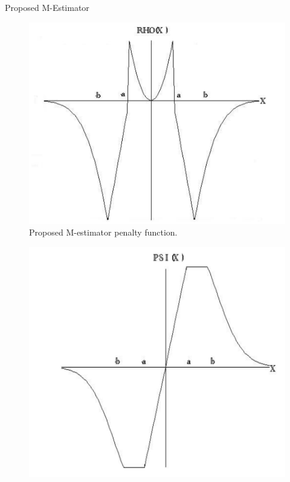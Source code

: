 \documentclass{beamer}
\begin{document}

\begin{frame}{Proposed M-Estimator}
\begin{multicols}{3}
\begin{figure}
\includegraphics[scale=0.15]{images/rho.png}
\caption{  Proposed M-estimator penalty function.}
\label{fig:rho}
\end{figure}
\begin{figure}
\includegraphics[scale=0.15]{images/psi.png}

\end{figure}
\end{multicols}
\end{frame}
\end{document}
